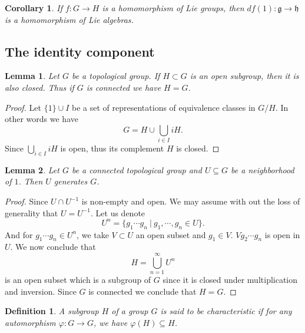 \documentclass{article}
\newtheorem{definition}{Definition}[section]
\newtheorem{lemma}{Lemma}[section]
\newtheorem{corollary}{Corollary}[section]
\numberwithin{equation}{section}
\begin{document}
\begin{corollary}
If $f:G\to H$ is a homomorphism of Lie groups, then $df(1):\mathfrak{g}\to\mathfrak{h}$ is a homomorphism of Lie algebras.
\end{corollary}

\subsection{The identity component}

\begin{lemma}
Let $G$ be a topological group. If $H\subset G$ is an open subgroup, then it is also closed. Thus if $G$ is connected we have $H=G$.
\label{op_subgroup}
\end{lemma}
\begin{proof}
Let $\{1\}\cup I$ be a set of representations of equivalence classes in $G/H$. In other words we have
\begin{equation*}
G = H\cup\bigcup_{i\in I}iH. 
\end{equation*}
Since $\bigcup_{i\in I}iH$ is open, thus its complement $H$ is closed.
\end{proof}

\begin{lemma}
Let $G$ be a connected topological group and $U\subseteq G$ be a neighborhood of $1$. Then $U$ generates $G$.
\label{gen_con_top}
\end{lemma}

\begin{proof}
Since $U\cap U^{-1}$ is non-empty and open. We may assume with out the loss of generality that $U=U^{-1}$. Let us denote 
\begin{equation*}
U^n = \{g_1\cdots g_n\:|\: g_1,\cdots,g_n\in U\}.
\end{equation*}
And for $g_1\cdots g_n\in U^n$, we take $V\subset U$ an open subset and $g_1\in V$. %
$Vg_2\cdots g_n$ is open in $U$. We now conclude that
\begin{equation*}
H=\bigcup_{n=1}^\infty U^n
\end{equation*}
is an open subset which is a subgroup of $G$ since it is closed under multiplication and inversion. Since $G$ is connected we conclude that $H=G$. 
\end{proof}

\begin{definition}
A subgroup $H$ of a group $G$ is said to be characteristic if for any automorphism $\varphi:G\to G$, we have $\varphi(H)\subseteq H$. 
\end{definition}
\end{document}
